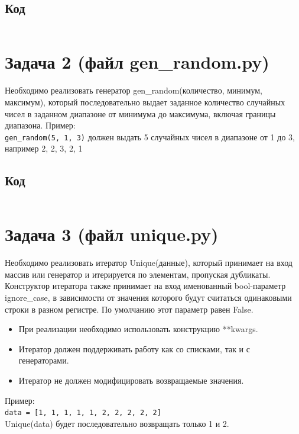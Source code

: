 \documentclass[20pt,a4paper]{report}
\begin{document}
		\subsection{Код}
			\small
			\inputminted[tabsize=4, linenos]{python}{field.py}
			\large

		\section{Задача 2 (файл gen\_random.py)}
		\qquad Необходимо реализовать генератор gen\_random(количество, минимум, максимум), который последовательно выдает заданное количество случайных чисел в заданном диапазоне от минимума до максимума, включая границы диапазона. Пример: \\

		\small \texttt{gen_random(5, 1, 3)} \large должен выдать 5 случайных чисел в диапазоне от 1 до 3, например 2, 2, 3, 2, 1 \\
		
		\subsection{Код}
			\small
			\inputminted[tabsize=4, linenos]{python}{gen_random.py}
			\large

		\section{Задача 3 (файл unique.py)}
		\qquad Необходимо реализовать итератор Unique(данные), который принимает на вход массив или генератор и итерируется по элементам, пропуская дубликаты. \\

		\qquad Конструктор итератора также принимает на вход именованный bool-параметр ignore\_case, в зависимости от значения которого будут считаться одинаковыми строки в разном регистре. По умолчанию этот параметр равен False. \\

		\begin{itemize}
			\item При реализации необходимо использовать конструкцию **kwargs.
			\item Итератор должен поддерживать работу как со списками, так и с генераторами.
			\item Итератор не должен модифицировать возвращаемые значения.
		\end{itemize}

		\qquad Пример: \\
		\small \texttt{data = [1, 1, 1, 1, 1, 2, 2, 2, 2, 2]} \\ \large 
		Unique(data) будет последовательно возвращать только 1 и 2. \\
\end{document}
